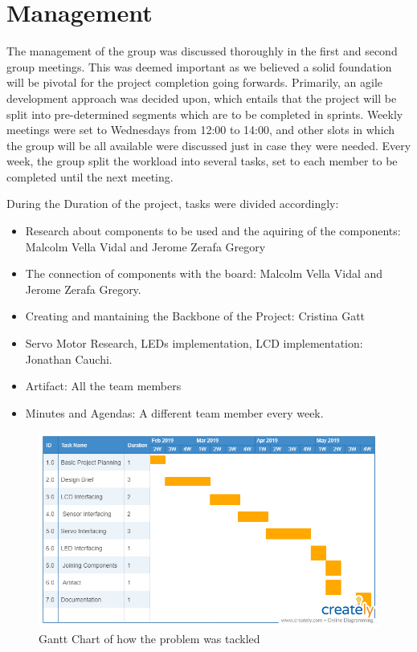 \documentclass[11pt,a4paper,twocolumn]{article}
\begin{document}
\section{Management}
The management of the group was discussed thoroughly in the first and second group meetings. This was deemed important as we believed a solid foundation will be pivotal for the project completion going forwards. 
Primarily, an agile development approach was decided upon, which entails that the project will be split into pre-determined segments which are to be completed in sprints. Weekly meetings were set to Wednesdays from 12:00 to 14:00, and other slots in which the group will be all available were discussed just in case they were needed. Every week, the group split the workload into several tasks, set to each member to be completed until the next meeting.

During the Duration of the project, tasks were divided accordingly:
	
\begin{itemize}
	\item Research about components to be used and the aquiring of the components: Malcolm Vella Vidal and Jerome Zerafa Gregory
	\item The connection of components with the board: Malcolm Vella Vidal and Jerome Zerafa Gregory.
	\item Creating and mantaining the Backbone of the Project: Cristina Gatt
	\item Servo Motor Research, LEDs implementation, LCD implementation: Jonathan Cauchi. 
	\item Artifact: All the team members
	\item Minutes and Agendas: A different team member every week.
\end{itemize}

\begin{figure}
	\centering
	\includegraphics[width=\textwidth]{gantt}
	\caption{Gantt Chart of how the problem was tackled}
	\label{fig:gantt}
	\centering
\end{figure}
\end{document}

